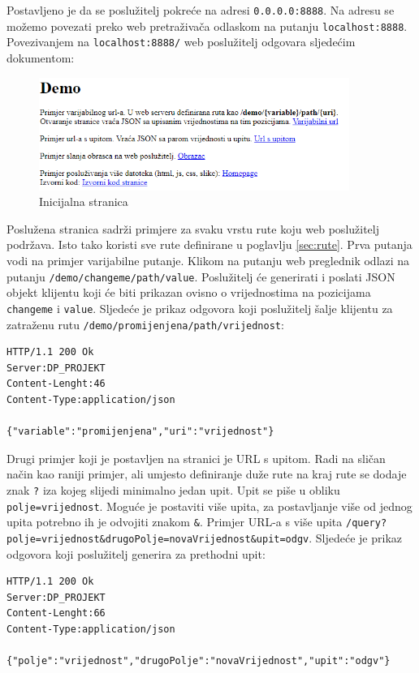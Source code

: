 \documentclass[]{foi}
\begin{document}
Postavljeno je da se poslužitelj pokreće na adresi \texttt{0.0.0.0:8888}. Na adresu se
možemo povezati preko web pretraživača odlaskom na putanju \texttt{localhost:8888}.
Povezivanjem na \texttt{localhost:8888/} web poslužitelj odgovara sljedećim dokumentom:
\begin{figure}[h!]
	\centering
	\includegraphics[width=0.9\textwidth]{slike/demo.png}
	\caption{Inicijalna stranica}
	\label{fig:init}
\end{figure}

Poslužena stranica sadrži primjere za svaku vrstu rute koju web poslužitelj podržava. Isto
tako koristi sve rute definirane u poglavlju \ref{sec:rute}. Prva putanja vodi na primjer
varijabilne putanje. Klikom na putanju web preglednik odlazi na putanju
\texttt{/demo/changeme/path/value}. Poslužitelj će generirati i poslati JSON objekt
klijentu koji će biti prikazan ovisno o vrijednostima na pozicijama \texttt{changeme} i
\texttt{value}. Sljedeće je prikaz odgovora koji poslužitelj šalje klijentu za
zatraženu rutu \texttt{/demo/promijenjena/path/vrijednost}:

\begin{verbatim}
HTTP/1.1 200 Ok
Server:DP_PROJEKT
Content-Lenght:46
Content-Type:application/json

{"variable":"promijenjena","uri":"vrijednost"}
\end{verbatim}

Drugi primjer koji je postavljen na stranici je URL s upitom. Radi na sličan način kao
raniji primjer, ali umjesto definiranje duže rute na kraj rute se dodaje znak \texttt{?}
iza kojeg slijedi minimalno jedan upit. Upit se piše u obliku \texttt{polje=vrijednost}.
Moguće je postaviti više upita, za postavljanje više od jednog upita potrebno ih je odvojiti
znakom \texttt{\&}. Primjer URL-a s više upita
\texttt{/query?polje=vrijednost\&drugoPolje=novaVrijednost\&upit=odgv}.
Sljedeće je prikaz odgovora koji poslužitelj generira za prethodni upit:
\begin{verbatim}
HTTP/1.1 200 Ok
Server:DP_PROJEKT
Content-Lenght:66
Content-Type:application/json

{"polje":"vrijednost","drugoPolje":"novaVrijednost","upit":"odgv"}
\end{verbatim}
\end{document}
